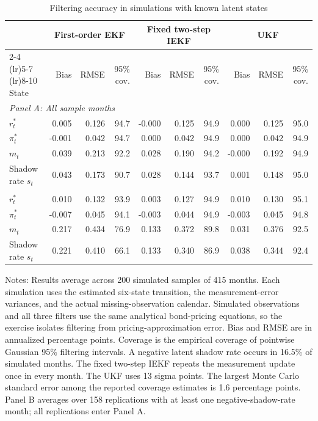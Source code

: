 \begin{table}[!htbp]
\centering
\begin{threeparttable}
\caption{Filtering accuracy in simulations with known latent states}
\label{oa:tab_filtering_accuracy}
\footnotesize
\begin{tabular*}{\textwidth}{@{\extracolsep{\fill}}lrrrrrrrrr@{}}
\toprule
& \multicolumn{3}{c}{First-order EKF} & \multicolumn{3}{c}{Fixed two-step IEKF} & \multicolumn{3}{c}{UKF} \\
\cmidrule(lr){2-4} \cmidrule(lr){5-7} \cmidrule(lr){8-10}
State & Bias & RMSE & 95\% cov. & Bias & RMSE & 95\% cov. & Bias & RMSE & 95\% cov. \\
\midrule
\multicolumn{10}{l}{\textit{Panel A: All sample months}} \\ 
$r_t^*$ & 0.005 & 0.126 & 94.7 & -0.000 & 0.125 & 94.9 & 0.000 & 0.125 & 95.0 \\
$\pi_t^*$ & -0.001 & 0.042 & 94.7 & 0.000 & 0.042 & 94.9 & 0.000 & 0.042 & 94.9 \\
$m_t$ & 0.039 & 0.213 & 92.2 & 0.028 & 0.190 & 94.2 & -0.000 & 0.192 & 94.9 \\
Shadow rate $s_t$ & 0.043 & 0.173 & 90.7 & 0.028 & 0.144 & 93.7 & 0.001 & 0.148 & 95.0 \\
\addlinespace
\multicolumn{10}{l}{\textit{Panel B: Months with a negative latent shadow rate}} \\
$r_t^*$ & 0.010 & 0.132 & 93.9 & 0.003 & 0.127 & 94.9 & 0.010 & 0.130 & 95.1 \\
$\pi_t^*$ & -0.007 & 0.045 & 94.1 & -0.003 & 0.044 & 94.9 & -0.003 & 0.045 & 94.8 \\
$m_t$ & 0.217 & 0.434 & 76.9 & 0.133 & 0.372 & 89.8 & 0.031 & 0.376 & 92.5 \\
Shadow rate $s_t$ & 0.221 & 0.410 & 66.1 & 0.133 & 0.340 & 86.9 & 0.038 & 0.344 & 92.4 \\
\bottomrule
\end{tabular*}
\begin{tablenotes}[flushleft]
\footnotesize
\item Notes: Results average across 200 simulated samples of 415 months. Each simulation uses the estimated six-state transition, the measurement-error variances, and the actual missing-observation calendar. Simulated observations and all three filters use the same analytical bond-pricing equations, so the exercise isolates filtering from pricing-approximation error. Bias and RMSE are in annualized percentage points. Coverage is the empirical coverage of pointwise Gaussian 95\% filtering intervals. A negative latent shadow rate occurs in 16.5\% of simulated months. The fixed two-step IEKF repeats the measurement update once in every month. The UKF uses 13 sigma points. The largest Monte Carlo standard error among the reported coverage estimates is 1.6 percentage points. Panel B averages over 158 replications with at least one negative-shadow-rate month; all replications enter Panel A.
\end{tablenotes}
\end{threeparttable}
\end{table}
